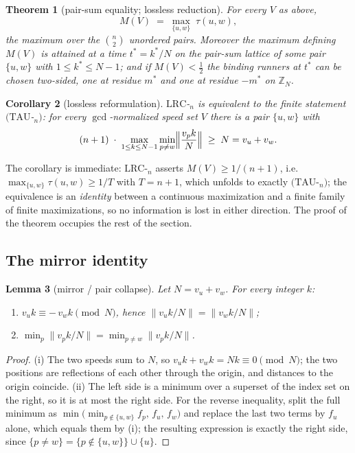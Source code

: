 \documentclass[11pt,a4paper]{article}
\numberwithin{equation}{section}
\theoremstyle{plain}
\theoremstyle{plain}
\newtheorem{theorem}{Theorem}[section]
\newtheorem{lemma}[theorem]{Lemma}
\newtheorem{corollary}[theorem]{Corollary}
\theoremstyle{definition}
\theoremstyle{remark}
\newcommand{\Z}{\mathbb{Z}}
\begin{document}
\begin{theorem}[pair-sum equality; lossless reduction]\label{thm:equality}
For every $V$ as above,
\[
M(V)\;=\;\max_{\{u,w\}}\;\tau(u,w),
\]
the maximum over the $\binom{n}{2}$ unordered pairs. Moreover the maximum
defining $M(V)$ is attained at a time $t^\ast=k^\ast/N$ on the pair-sum
lattice of some pair $\{u,w\}$ with $1\le k^\ast\le N-1$; and if
$M(V)<\tfrac12$ the binding runners at $t^\ast$ can be chosen two-sided,
one at residue $m^\ast$ and one at residue $-m^\ast$ on $\Z_N$.
\end{theorem}

\begin{corollary}[lossless reformulation]\label{cor:tau}
$\mathrm{LRC}$-$_n$ is equivalent to the finite statement
$(\mathrm{TAU}$-$_n)$: for every $\gcd$-normalized speed set $V$ there is
a pair $\{u,w\}$ with
\[
(n+1)\;\cdot\;\max_{1\le k\le N-1}\min_{p\ne w}
\Bigl\lVert \frac{v_p k}{N}\Bigr\rVert \;\ge\; N=v_u+v_w .
\]
\end{corollary}

The corollary is immediate: $\mathrm{LRC}$-$_n$ asserts $M(V)\ge
1/(n{+}1)$, i.e.\ $\max_{\{u,w\}}\tau(u,w)\ge 1/T$ with $T=n{+}1$, which
unfolds to exactly $(\mathrm{TAU}$-$_n)$; the equivalence is an
\emph{identity} between a continuous maximization and a finite family of
finite maximizations, so no information is lost in either direction. The
proof of the theorem occupies the rest of the section.

\subsection{The mirror identity}

\begin{lemma}[mirror / pair collapse]\label{lem:mirror}
Let $N=v_u+v_w$. For every integer $k$:
\begin{enumerate}[leftmargin=1.8em,itemsep=1pt]
\item[(i)] $v_u k\equiv -\,v_w k \pmod N$, hence
  $\lVert v_u k/N\rVert=\lVert v_w k/N\rVert$;
\item[(ii)] $\min_{p}\lVert v_p k/N\rVert
  =\min_{p\ne w}\lVert v_p k/N\rVert$.
\end{enumerate}
\end{lemma}

\begin{proof}
(i) The two speeds sum to $N$, so
$v_u k+v_w k=Nk\equiv 0 \pmod N$; the two positions are reflections of
each other through the origin, and distances to the origin coincide.
(ii) The left side is a minimum over a superset of the index set on the
right, so it is at most the right side. For the reverse inequality,
split the full minimum as
$\min\bigl(\min_{p\notin\{u,w\}} f_p,\,f_u,\,f_w\bigr)$ and replace the
last two terms by $f_u$ alone, which equals them by (i); the resulting
expression is exactly the right side, since
$\{p\ne w\}=\{p\notin\{u,w\}\}\cup\{u\}$.
\end{proof}
\end{document}
